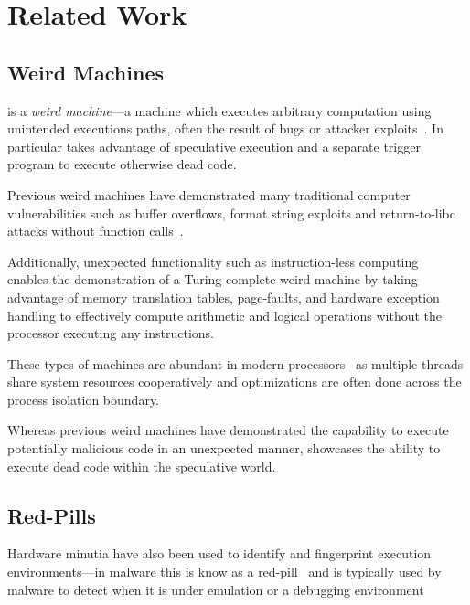 \section{Related Work}
\label{sec:related-work}


\subsection{Weird Machines}

\speculake is a \textit{weird machine}---a machine which executes arbitrary
computation using unintended executions paths, often the result of bugs or
attacker exploits~\cite{weird_machines,bratus2011exploit,weird_exploits}. In
particular \speculake takes advantage of speculative execution and a separate
trigger program to execute otherwise dead code.

Previous weird machines have demonstrated many traditional computer
vulnerabilities such as buffer overflows, format string exploits and
return-to-libc attacks without function calls~\cite{buffer_overflow,
format_string_exploit, shacham2007geometry}. 

Additionally, unexpected functionality such as instruction-less
computing~\cite{bangert2013page} enables the demonstration of a Turing complete
weird machine by taking advantage of memory translation tables, page-faults, and
hardware exception handling to effectively compute arithmetic and logical
operations without the processor executing any instructions.

These types of machines are abundant in modern processors~\cite{d2015exploiting}
as multiple threads share system resources cooperatively and optimizations are
often done across the process isolation boundary. 

Whereas previous weird machines have demonstrated the capability to execute
potentially malicious code in an unexpected manner, \speculake showcases the
ability to execute dead code within the speculative world.

\subsection{Red-Pills}
Hardware minutia have also been used to identify and fingerprint execution
environments---in malware this is know as a red-pill~\cite{red-pill} and is
typically used by malware to detect when it is under emulation or a debugging
environment~\cite{lindorfer2011detecting, balzarotti2010efficient,
paleari2009fistful}

